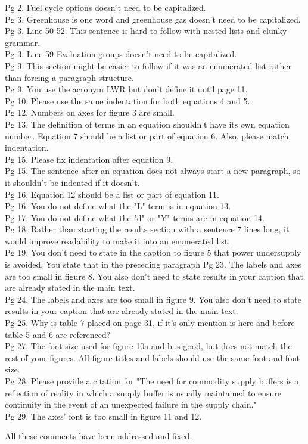 \documentclass[answers,11pt]{exam}
\begin{document}
\begin{questions}
Pg 2. Fuel cycle options doesn't need to be capitalized. \\
Pg 3. Greenhouse is one word and greenhouse gas doesn't need to be capitalized. \\
Pg 3. Line 50-52. This sentence is hard to follow with nested lists and clunky grammar.\\
Pg 3. Line 59 Evaluation groups doesn't need to be capitalized. \\
Pg 9. This section might be easier to follow if it was an enumerated list rather than forcing a paragraph structure.\\
Pg 9. You use the acronym LWR but don't define it until page 11.\\
Pg 10. Please use the same indentation for both equations 4 and 5.\\
Pg 12. Numbers on axes for figure 3 are small.\\
Pg 13. The definition of terms in an equation shouldn't have its own equation number. Equation 7 should be a list or part of equation 6. Also, please match indentation.\\
Pg 15. Please fix indentation after equation 9.\\
Pg 15. The sentence after an equation does not always start a new paragraph, so it shouldn't be indented if it doesn't.\\
Pg 16. Equation 12 should be a list or part of equation 11. \\
Pg 16. You do not define what the "L" term is in equation 13.\\
Pg 17. You do not define what the "d" or "Y" terms are in equation 14.\\
Pg 18. Rather than starting the results section with a sentence 7 lines long, it would improve readability to make it into an enumerated list.\\
Pg 19. You don't need to state in the caption to figure 5 that power undersupply is avoided. You state that in the preceding paragraph
Pg 23. The labels and axes are too small in figure 8. You also don't need to state results in your caption that are already stated in the main text.\\
Pg 24. The labels and axes are too small in figure 9. You also don't need to state results in your caption that are already stated in the main text.\\
Pg 25. Why is table 7 placed on page 31, if it's only mention is here and before table 5 and 6 are referenced?\\
Pg 27. The font size used for figure 10a and b is good, but does not match the rest of your figures. All figure titles and labels should use the same font and font size. \\
Pg 28. Please provide a citation for "The need for commodity supply buffers is a reflection of reality in which a supply buffer is usually maintained to ensure continuity in the event of an unexpected failure in the supply chain." \\
Pg 29. The axes' font is too small in figure 11 and 12.\\
\begin{solution}
All these comments have been addressed and fixed. 
\end{solution}


\end{questions}
\end{document}
